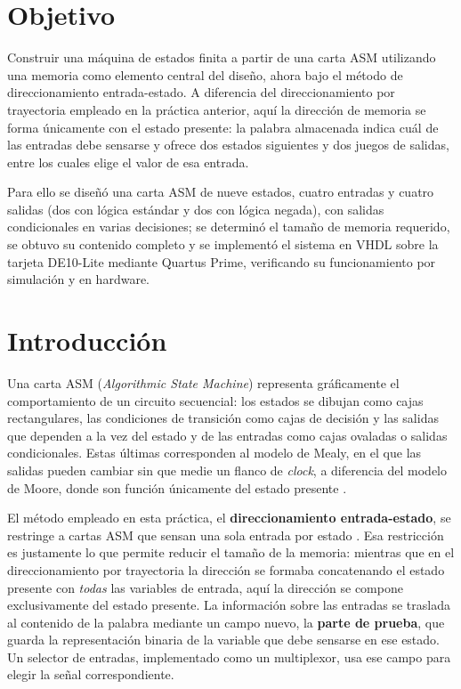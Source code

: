 \section{Objetivo}

Construir una máquina de estados finita a partir de una carta ASM utilizando una memoria
como elemento central del diseño, ahora bajo el método de direccionamiento
entrada-estado. A diferencia del direccionamiento por trayectoria empleado en la
práctica anterior, aquí la dirección de memoria se forma únicamente con el estado
presente: la palabra almacenada indica cuál de las entradas debe sensarse y ofrece dos
estados siguientes y dos juegos de salidas, entre los cuales elige el valor de esa
entrada.

Para ello se diseñó una carta ASM de nueve estados, cuatro entradas y cuatro salidas
(dos con lógica estándar y dos con lógica negada), con salidas condicionales en varias
decisiones; se determinó el tamaño de memoria requerido, se obtuvo su contenido completo
y se implementó el sistema en VHDL sobre la tarjeta DE10-Lite mediante Quartus Prime,
verificando su funcionamiento por simulación y en hardware.

\section{Introducción}

Una carta ASM (\textit{Algorithmic State Machine}) representa gráficamente el
comportamiento de un circuito secuencial: los estados se dibujan como cajas
rectangulares, las condiciones de transición como cajas de decisión y las salidas que
dependen a la vez del estado y de las entradas como cajas ovaladas o salidas
condicionales. Estas últimas corresponden al modelo de Mealy, en el que las salidas
pueden cambiar sin que medie un flanco de \textit{clock}, a diferencia del modelo de
Moore, donde son función únicamente del estado presente \cite{mano}.

El método empleado en esta práctica, el \textbf{direccionamiento entrada-estado}, se
restringe a cartas ASM que sensan una sola entrada por estado \cite{savage}. Esa
restricción es justamente lo que permite reducir el tamaño de la memoria: mientras que en
el direccionamiento por trayectoria la dirección se formaba concatenando el estado
presente con \emph{todas} las variables de entrada, aquí la dirección se compone
exclusivamente del estado presente. La información sobre las entradas se traslada al
contenido de la palabra mediante un campo nuevo, la \textbf{parte de prueba}, que guarda
la representación binaria de la variable que debe sensarse en ese estado. Un selector de
entradas, implementado como un multiplexor, usa ese campo para elegir la señal
correspondiente.

